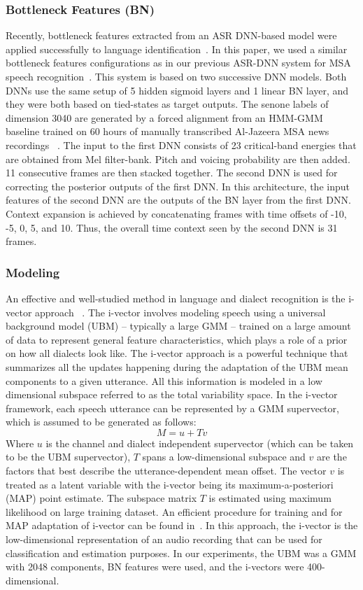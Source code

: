 \documentclass{article}
\begin{document}
\subsubsection{Bottleneck Features (BN)}
Recently, bottleneck features extracted from an ASR DNN-based model were applied successfully to language identification~\cite{Ysong2013,Pavel2014,Fred2015}. In this paper, we used a similar bottleneck features configurations as in our previous ASR-DNN system for MSA speech recognition~\cite{Card2015}. This system is based on two successive DNN models. Both DNNs use the same setup of 5 hidden sigmoid layers and 1 linear BN layer, and they were both based on tied-states as target outputs. The senone labels of dimension 3040 are generated by a forced alignment from an HMM-GMM baseline trained on 60 hours of manually transcribed Al-Jazeera MSA news recordings ~\cite{ali2014complete}.
The input to the first DNN consists of 23 critical-band energies that are obtained from Mel filter-bank. Pitch and voicing probability are then added. 11 consecutive frames are then stacked together. The second DNN is used for correcting the posterior outputs of the first DNN. In this architecture, the input features of the second DNN are the outputs of the BN layer from the first DNN. Context expansion is achieved by concatenating frames with time offsets of -10, -5, 0, 5, and 10. Thus, the overall time context seen by the second DNN is 31 frames.

\subsubsection{Modeling}
An effective and well-studied method in language and dialect recognition is the i-vector approach ~\cite{bahari2014non,dehak2011front,dehak2011language}. The i-vector involves  modeling speech using a universal background model (UBM) -- typically a large GMM -- trained on a large amount of data to represent general feature characteristics, which plays a role of a prior on how all dialects look like. The i-vector approach is a powerful technique that summarizes all the updates happening during the adaptation of the UBM mean components to a given utterance. All this information is modeled in a low dimensional subspace referred to as the total variability space. In the i-vector framework, each speech utterance can be represented by a GMM supervector, which is assumed to be generated as follows:
\[M = u + Tv \]
Where $u$ is the channel and dialect independent supervector (which can be taken to be the UBM supervector),
$T$ spans a low-dimensional subspace and $v$ are the factors that best describe the utterance-dependent mean offset. The vector $v$ is treated as a latent variable with the  i-vector being its maximum-a-posteriori (MAP) point estimate. The subspace matrix $T$ is estimated using maximum likelihood on large training dataset. An efficient procedure for training and for MAP adaptation of i-vector can be found in~\cite{kenny2008study}. In this approach, the i-vector is the low-dimensional representation of an audio recording that can be used for classification and estimation purposes. In our experiments, the UBM was a GMM with 2048 components, BN features were used, and the i-vectors were 400-dimensional.
\end{document}
